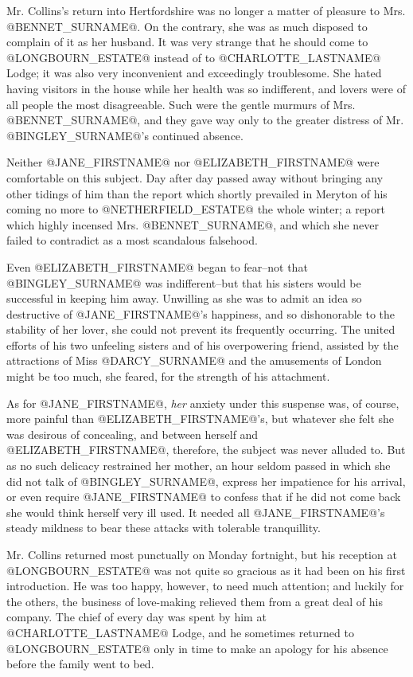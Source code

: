Mr. Collins's return into Hertfordshire was no longer a matter of
pleasure to Mrs. @BENNET_SURNAME@. On the contrary, she was as much disposed to
complain of it as her husband. It was very strange that he should come
to @LONGBOURN_ESTATE@ instead of to @CHARLOTTE_LASTNAME@ Lodge; it was also very inconvenient
and exceedingly troublesome. She hated having visitors in the house
while her health was so indifferent, and lovers were of all people the
most disagreeable. Such were the gentle murmurs of Mrs. @BENNET_SURNAME@, and
they gave way only to the greater distress of Mr. @BINGLEY_SURNAME@'s continued
absence.

Neither @JANE_FIRSTNAME@ nor @ELIZABETH_FIRSTNAME@ were comfortable on this subject. Day after
day passed away without bringing any other tidings of him than the
report which shortly prevailed in Meryton of his coming no more to
@NETHERFIELD_ESTATE@ the whole winter; a report which highly incensed Mrs.
@BENNET_SURNAME@, and which she never failed to contradict as a most scandalous
falsehood.

Even @ELIZABETH_FIRSTNAME@ began to fear--not that @BINGLEY_SURNAME@ was indifferent--but that
his sisters would be successful in keeping him away. Unwilling as
she was to admit an idea so destructive of @JANE_FIRSTNAME@'s happiness, and so
dishonorable to the stability of her lover, she could not prevent its
frequently occurring. The united efforts of his two unfeeling sisters
and of his overpowering friend, assisted by the attractions of Miss
@DARCY_SURNAME@ and the amusements of London might be too much, she feared, for
the strength of his attachment.

As for @JANE_FIRSTNAME@, \textit{her} anxiety under this suspense was, of course, more
painful than @ELIZABETH_FIRSTNAME@'s, but whatever she felt she was desirous of
concealing, and between herself and @ELIZABETH_FIRSTNAME@, therefore, the subject
was never alluded to. But as no such delicacy restrained her mother,
an hour seldom passed in which she did not talk of @BINGLEY_SURNAME@, express her
impatience for his arrival, or even require @JANE_FIRSTNAME@ to confess that if he
did not come back she would think herself very ill used. It needed
all @JANE_FIRSTNAME@'s steady mildness to bear these attacks with tolerable
tranquillity.

Mr. Collins returned most punctually on Monday fortnight, but his
reception at @LONGBOURN_ESTATE@ was not quite so gracious as it had been on his
first introduction. He was too happy, however, to need much attention;
and luckily for the others, the business of love-making relieved them
from a great deal of his company. The chief of every day was spent by
him at @CHARLOTTE_LASTNAME@ Lodge, and he sometimes returned to @LONGBOURN_ESTATE@ only in time
to make an apology for his absence before the family went to bed.

